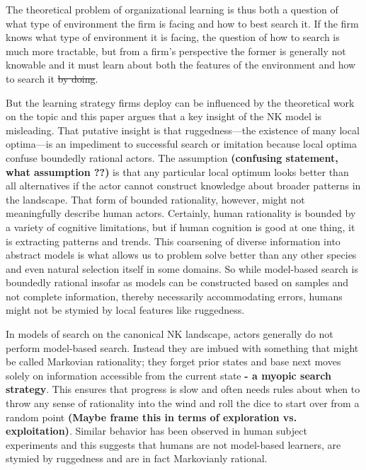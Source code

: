 \documentclass[12pt]{article}
\begin{document}
The theoretical problem of organizational learning is thus both a question of what type of environment the firm is facing and how to best search it. If the firm knows what type of environment it is facing, the question of how to search is much more tractable, but from a firm's perspective the former is generally not knowable and it must learn about both the features of the environment and how to search it \sout{by doing}.


But the learning strategy firms deploy can be influenced by the theoretical work on the topic and this paper argues that a key insight of the NK model is misleading. That putative insight is that ruggedness---the existence of many local optima---is an impediment to successful search or imitation because local optima confuse boundedly rational actors. The assumption\textbf{ (confusing statement, what assumption ??)} is that any particular local optimum looks better than all alternatives if the actor cannot construct knowledge about broader patterns in the landscape. That form of bounded rationality, however, might not meaningfully describe human actors. Certainly, human rationality is bounded by a variety of cognitive limitations, but if human cognition is good at one thing, it is extracting patterns and trends. This coarsening of diverse information into abstract models is what allows us to problem solve better than any other species and even natural selection itself in some domains. So while model-based search is boundedly rational insofar as models can be constructed based on samples and not complete information, thereby necessarily accommodating errors, humans might not be stymied by local features like ruggedness.

In models of search on the canonical NK landscape, actors generally do not perform model-based search. Instead they are imbued with something that might be called Markovian rationality; they forget prior states and base next moves solely on information accessible from the current state \textbf{- a myopic search strategy}. This ensures that progress is slow and often needs rules about when to throw any sense of rationality into the wind and roll the dice to start over from a random point \textbf{(Maybe frame this in terms of exploration vs. exploitation)}. Similar behavior has been observed in human subject experiments \cite{Billinger2014, Vuculescu2017} and this suggests that humans are not model-based learners, are stymied by ruggedness  and are in fact Markovianly rational.
\end{document}
